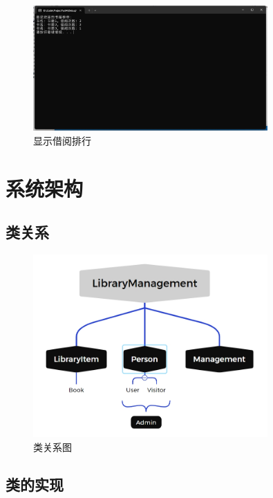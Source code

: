 \documentclass[12pt,twoside]{ctexart}
\begin{document}
\begin{figure}[H]
    \centering
    \includegraphics[width=0.8\textwidth]{Book/borrowlist.png}
    \caption{显示借阅排行}
    \label{fig:BorrowList}
\end{figure}

\newpage
\section{系统架构}

\subsection{类关系}
\begin{figure}[H]
    \centering
    \includegraphics[width=0.8\textwidth]{Pic/LibraryManagement.png}
    \caption{类关系图}
\end{figure}

\subsection{类的实现}
\end{document}
